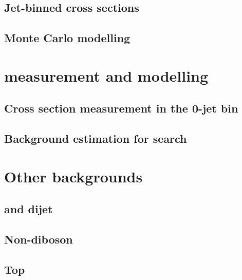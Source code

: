 \documentclass[hyper,linkcolor=blue]{mythesis}
\begin{document}
\begin{mainmatter}
    \section{Jet-binned cross sections}
      \label{sec:ggf_jetbin}
      
    \clearpage
    \section{Monte Carlo modelling}
      \label{sec:ggf_mc}
      

  \chapter{\WW measurement and modelling}
    \label{chap:ww}
    
    \section{Cross section measurement in the 0-jet bin}
      \label{sec:ww_meas}
      
    \section{Background estimation for \HWW search}
      \label{sec:ww_as_bkg}
      

  \chapter{Other backgrounds}
    \label{chap:backgrounds}
    
    \section{\Wjets and dijet}
      \label{sec:wjets}
      
    \clearpage
    \section{Non-\WW diboson}
      \label{sec:diboson}
      
    \section{Top}
      \label{sec:top}
      
    \section{\DY}
      \label{sec:dy}
      

\end{mainmatter}
\end{document}
